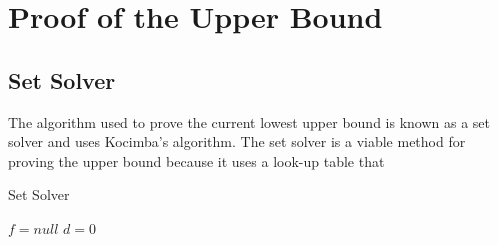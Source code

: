 \section{Proof of the Upper Bound}


\subsection{Set Solver}
The algorithm used to prove the current lowest upper bound is known as a set solver and uses Kocimba's algorithm. The set solver is a viable method for proving the upper bound because it uses a look-up table that

\begin{algorithm}[!h]                     
\caption{Set Solver \cite{rokicki09}}          
\label{alg:setSolver}        
\begin{algorithmic}[1]
\STATE $f=null$  %
\STATE $d=0$
		\ENDIF
			\ENDFOR
		\ENDIF
		\ENDIF
\ENDWHILE
\end{algorithmic}
\end{algorithm}